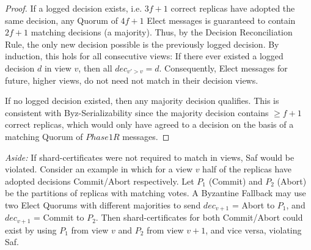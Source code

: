 \begin{proof} If a logged decision exists, i.e. $3f+1$ correct replicas have adopted the same decision, any Quorum of $4f+1$ Elect messages is guaranteed to contain $2f+1$ matching decisions (a majority). Thus, by the Decision Reconciliation Rule, the only new decision possible is the previously logged decision. By induction, this hols for all consecutive views: If there ever existed a logged decision $d$ in view $v$, then all $dec_{v' > v} = d$. Consequently, Elect messages for future, higher views, do not need not match in their decision views.

If no logged decision existed, then any majority decision qualifies. This is consistent with Byz-Serializability since the majority decision contains $\geq f+1$ correct replicas, which would only have agreed to a decision on the basis of a matching Quorum of $Phase1R$ messages.
\end{proof}

\textit{Aside:} If shard-certificates were not required to match in views, Saf would be violated. Consider an example in which for a view $v$ half of the replicas have adopted decisions Commit/Abort respectively. Let $P_1$ (Commit) and $P_2$ (Abort) be the partitions of replicas with matching votes. A Byzantine Fallback may use two Elect Quorums with different majorities to send $dec_{v+1}$ = Abort to $P_1$, and $dec_{v+1}$ = Commit to $P_2$. Then shard-certificates for both Commit/Abort could exist by using $P_1$ from view $v$ and $P_2$ from view $v+1$, and vice versa, violating Saf. 